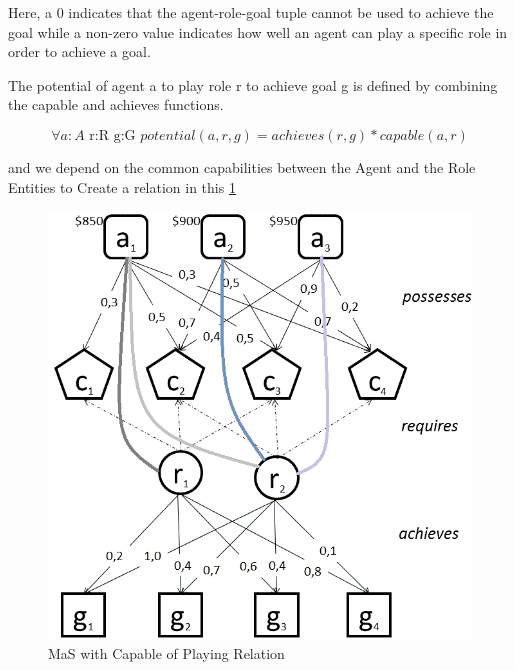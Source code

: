 Here, a 0 indicates that the agent-role-goal tuple cannot be
used to achieve the goal while a non-zero value indicates how well an agent can play
a specific role in order to achieve a goal.  

The potential of agent a to play role r 
to achieve goal g is defined by combining the capable and achieves functions.\cite{omacs4}

\begin{equation}
\forall a:A\textrm{ r:R g:G }potential(a,r,g)=achieves(r,g)*capable(a,r)\label{eq:potentialFunc}
\end{equation}

and we depend on the common capabilities between the Agent and the Role Entities to Create a relation in this \ref{fig:Capable Of playing Relation} 





\begin{figure}[th]
	\centering
		\includegraphics[scale=0.5]{chapiter1/img/mag}
	\caption{\label{fig:Capable Of playing Relation} MaS with Capable of Playing Relation \cite{omacs0} }
\end{figure}

































